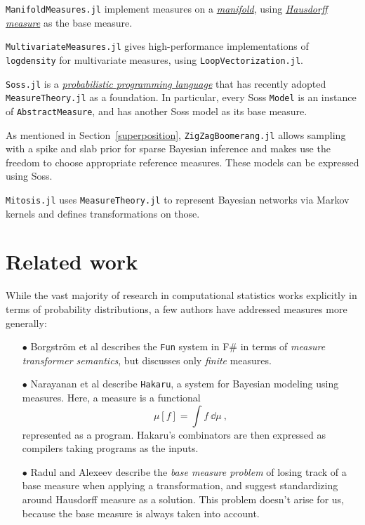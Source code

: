 \documentclass{juliacon}
\begin{document}
\verb|ManifoldMeasures.jl|\cite{manifoldmeasures} implement measures on a \href{https://en.wikipedia.org/wiki/Manifold}{\emph{manifold}}, using \href{https://en.wikipedia.org/wiki/Hausdorff_measure}{\emph{Hausdorff measure}} as the base measure.

\verb|MultivariateMeasures.jl|\cite{multivariatemeasures} gives high-performance implementations of \verb|logdensity| for multivariate measures, using \verb|LoopVectorization.jl|\cite{loopvectorization}.

\verb|Soss.jl|\cite{scherrer2020soss} is a \href{https://en.wikipedia.org/wiki/Probabilistic_programming}{\emph{probabilistic programming language}} that has recently adopted \verb|MeasureTheory.jl| as a foundation. In particular, every Soss \verb|Model| is an instance of \verb|AbstractMeasure|, and has another Soss model as its base measure.

As mentioned in Section~\ref{superposition}, \verb|ZigZagBoomerang.jl|\cite{https://doi.org/10.5281/zenodo.3931118} allows sampling with a spike and slab prior for sparse Bayesian inference and makes use the freedom to choose appropriate reference measures.  These models can be expressed using Soss.

\verb|Mitosis.jl|\cite{arxiv2010.03509} uses \verb|MeasureTheory.jl| to represent Bayesian networks via Markov kernels and defines transformations on those.



\section{Related work}

While the vast majority of research in computational statistics works explicitly in terms of probability distributions, a few authors have addressed measures more generally:

\begin{itemize}
\item[$\bullet\!$]Borgstr\"om et al \cite{Borgstr_m_2013} describes the \verb|Fun| system in F\# in terms of \emph{measure transformer semantics}, but discusses only \emph{finite} measures.

\item[$\bullet\!$]Narayanan et al \cite{narayanan2016probabilistic} describe \verb|Hakaru|, a system for Bayesian modeling using measures. Here, a measure is a functional
\[
\mu[f] = \int f\ \dd\mu\ ,
\]
represented as a program. Hakaru's combinators are then expressed as compilers taking programs as the inputs.

\item[$\bullet\!$]Radul and Alexeev \cite{Radul2020} describe the \emph{base measure problem} of losing track of a base measure when applying a transformation, and suggest standardizing around Hausdorff measure as a solution. This problem doesn't arise for us, because the base measure is always taken into account.


\end{itemize}
\end{document}
